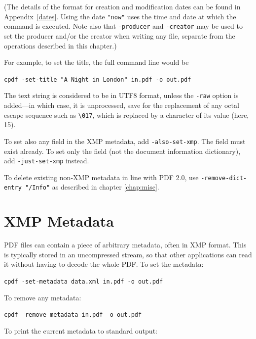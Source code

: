 \documentclass{book}
\begin{document}
  \noindent (The details of the format for creation and modification dates can be found
in Appendix~\ref{dates}. Using the date \texttt{"now"} uses the time and date
at which the command is executed. Note also that \texttt{-producer} and \texttt{-creator} may be used to set the producer and/or the creator when writing any file, separate from the operations described in this chapter.)
  
  \vspace{2mm}
  For example, to set the title, the full command line would be

  \begin{framed}
    \noindent\small\verb!cpdf -set-title "A Night in London" in.pdf -o out.pdf!
  \end{framed}

\noindent The text string is considered to be in UTF8 format, unless the \texttt{-raw}
option is added---in which case, it is unprocessed, save for the replacement of any octal escape sequence such as \texttt{\textbackslash 017}, which is replaced by a character of its value (here, 15).

To set also any field in the XMP metadata, add \texttt{-also-set-xmp}. The field must exist already. To set only the field (not the document information dictionary), add \texttt{-just-set-xmp} instead.

To delete existing non-XMP metadata in line with PDF 2.0, use \texttt{-remove-dict-entry "/Info"} as described in chapter \ref{chap:misc}.

  \section{XMP Metadata}
  PDF files can contain a piece of arbitrary metadata, often in XMP format.
This is typically stored in an uncompressed stream, so that other applications
can read it without having to decode the whole PDF. To set the metadata:

  \begin{framed}
    \noindent\small\verb!cpdf -set-metadata data.xml in.pdf -o out.pdf!
  \end{framed}

  \noindent To remove any metadata:

  \begin{framed}
    \noindent\small\verb!cpdf -remove-metadata in.pdf -o out.pdf!
  \end{framed}

  \noindent To print the current metadata to standard output:
\end{document}
